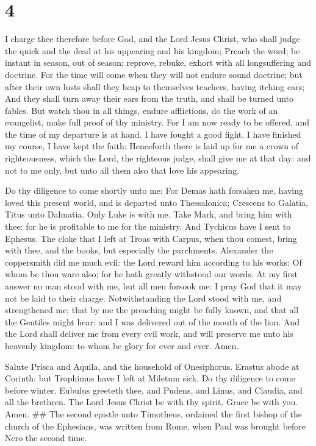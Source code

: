 \hypertarget{section-3}{%
\section{4}\label{section-3}}

 I charge thee therefore before God, and the Lord Jesus
Christ, who shall judge the quick and the dead at his appearing and his
kingdom;  Preach the word; be instant in season, out of
season; reprove, rebuke, exhort with all longsuffering and doctrine.
 For the time will come when they will not endure sound
doctrine; but after their own lusts shall they heap to themselves
teachers, having itching ears;  And they shall turn away
their ears from the truth, and shall be turned unto fables. 
But watch thou in all things, endure afflictions, do the work of an
evangelist, make full proof of thy ministry.  For I am now
ready to be offered, and the time of my departure is at hand.
 I have fought a good fight, I have finished my course, I
have kept the faith:  Henceforth there is laid up for me a
crown of righteousness, which the Lord, the righteous judge, shall give
me at that day: and not to me only, but unto all them also that love his
appearing.

 Do thy diligence to come shortly unto me:  For
Demas hath forsaken me, having loved this present world, and is departed
unto Thessalonica; Crescens to Galatia, Titus unto Dalmatia.
 Only Luke is with me. Take Mark, and bring him with thee:
for he is profitable to me for the ministry.  And Tychicus
have I sent to Ephesus.  The cloke that I left at Troas
with Carpus, when thou comest, bring with thee, and the books, but
especially the parchments.  Alexander the coppersmith did
me much evil: the Lord reward him according to his works: 
Of whom be thou ware also; for he hath greatly withstood our words.
 At my first answer no man stood with me, but all men
forsook me: I pray God that it may not be laid to their charge.
 Notwithstanding the Lord stood with me, and strengthened
me; that by me the preaching might be fully known, and that all the
Gentiles might hear: and I was delivered out of the mouth of the lion.
 And the Lord shall deliver me from every evil work, and
will preserve me unto his heavenly kingdom: to whom be glory for ever
and ever. Amen.

 Salute Prisca and Aquila, and the household of
Onesiphorus.  Erastus abode at Corinth: but Trophimus have
I left at Miletum sick.  Do thy diligence to come before
winter. Eubulus greeteth thee, and Pudens, and Linus, and Claudia, and
all the brethren.  The Lord Jesus Christ be with thy
spirit. Grace be with you. Amen. \#\# The second epistle unto Timotheus,
ordained the first bishop of the church of the Ephesians, was written
from Rome, when Paul was brought before Nero the second time.
